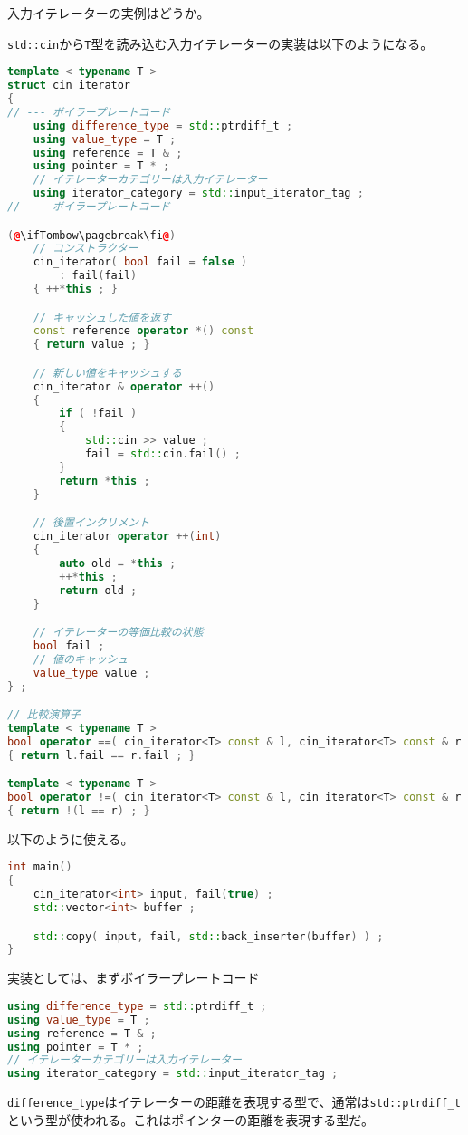 入力イテレーターの実例はどうか。

\texttt{std::cin}から\texttt{T}型を読み込む入力イテレーターの実装は以下のようになる。

\begin{lstlisting}[language={C++}]
template < typename T >
struct cin_iterator
{
// --- ボイラープレートコード
    using difference_type = std::ptrdiff_t ;
    using value_type = T ;
    using reference = T & ;
    using pointer = T * ;
    // イテレーターカテゴリーは入力イテレーター
    using iterator_category = std::input_iterator_tag ;
// --- ボイラープレートコード

(@\ifTombow\pagebreak\fi@)
    // コンストラクター
    cin_iterator( bool fail = false )
        : fail(fail)
    { ++*this ; }    

    // キャッシュした値を返す
    const reference operator *() const
    { return value ; }

    // 新しい値をキャッシュする
    cin_iterator & operator ++()
    {
        if ( !fail )
        {
            std::cin >> value ;
            fail = std::cin.fail() ;
        }
        return *this ;
    }

    // 後置インクリメント
    cin_iterator operator ++(int)
    {
        auto old = *this ;
        ++*this ;
        return old ;
    }

    // イテレーターの等価比較の状態
    bool fail ;
    // 値のキャッシュ
    value_type value ;
} ;

// 比較演算子
template < typename T >
bool operator ==( cin_iterator<T> const & l, cin_iterator<T> const & r )
{ return l.fail == r.fail ; }

template < typename T >
bool operator !=( cin_iterator<T> const & l, cin_iterator<T> const & r )
{ return !(l == r) ; }
\end{lstlisting}

\ifTombow\pagebreak\fi
以下のように使える。

\begin{lstlisting}[language={C++}]
int main()
{
    cin_iterator<int> input, fail(true) ;
    std::vector<int> buffer ;

    std::copy( input, fail, std::back_inserter(buffer) ) ;
}
\end{lstlisting}

実装としては、まずボイラープレートコード
\begin{lstlisting}[language={C++}]
using difference_type = std::ptrdiff_t ;
using value_type = T ;
using reference = T & ;
using pointer = T * ;
// イテレーターカテゴリーは入力イテレーター
using iterator_category = std::input_iterator_tag ;
\end{lstlisting}
\texttt{difference\_type}はイテレーターの距離を表現する型で、通常は\texttt{std::ptrdiff\_t}という型が使われる。これはポインターの距離を表現する型だ。

